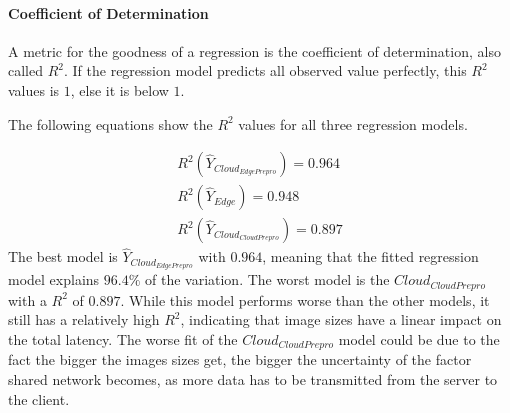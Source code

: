 \paragraph{Coefficient of Determination}
A metric for the goodness of a regression is the coefficient of determination, also called $R^2$.
If the regression model predicts all observed value perfectly, this $R^2$ values is $1$, else it is below $1$.

The following equations show the $R^2$ values for all three regression models.

\begin{equation*}
\begin{split}
R^2(\hat{Y}_{Cloud_{EdgePrepro}}) = 0.964\\
R^2(\hat{Y}_{Edge}) = 0.948\\
R^2(\hat{Y}_{Cloud_{CloudPrepro}}) = 0.897
\end{split}
\end{equation*}
The best model is $\hat{Y}_{Cloud_{EdgePrepro}}$ with $0.964$, meaning that the fitted regression model explains $96.4\%$ of the variation.
The worst model is the $Cloud_{CloudPrepro}$ with a $R^2$ of $0.897$.
While this model performs worse than the other models, it still has a relatively high $R^2$, indicating that image sizes have a linear impact on the total latency.
The worse fit of the $Cloud_{CloudPrepro}$ model could be due to the fact the bigger the images sizes get, the bigger the uncertainty of the factor shared network becomes, as more data has to be transmitted from the server to the client.
